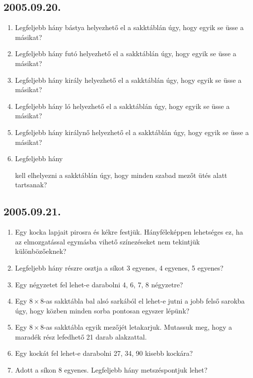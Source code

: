 \subsection*{2005.09.20.}
\begin{enumerate}
\item  Legfeljebb hány bástya helyezhető el a sakktáblán úgy, hogy egyik se üsse a másikat?
\item Legfeljebb hány futó helyezhető el a sakktáblán úgy, hogy egyik se üsse a másikat?
\item Legfeljebb hány király helyezhető el a sakktáblán úgy, hogy egyik se üsse a másikat?
\item Legfeljebb hány ló helyezhető el a sakktáblán úgy, hogy egyik se üsse a másikat?
\item Legfeljebb hány királynő helyezhető el a sakktáblán úgy, hogy egyik se üsse a másikat?
\item Legfeljebb hány
kell elhelyezni a sakktáblán úgy, hogy minden
szabad mezőt ütés alatt tartsanak?
\end{enumerate}


\subsection*{2005.09.21.}
\begin{enumerate}
\item Egy kocka lapjait pirosra és kékre festjük. Hányféleképpen lehetséges ez, ha az elmozgatással egymásba vihető színezéseket nem tekintjük különbözőeknek?

\item Legfeljebb hány részre osztja a síkot 3 egyenes, 4 egyenes, 5 egyenes?

\item Egy négyzetet fel lehet-e darabolni 4, 6, 7, 8 négyzetre?

\item Egy $8 \times 8$-as sakktábla bal alsó sarkából el lehet-e jutni a jobb felső sarokba úgy, hogy közben minden sorba pontosan egyszer lépünk?

\item Egy $8 \times 8$-as sakktábla egyik mezőjét letakarjuk. Mutassuk meg, hogy a maradék rész lefedhető 21 darab
alakzattal.

\item Egy kockát fel lehet-e darabolni 27, 34, 90 kisebb kockára?

\item Adott a síkon 8 egyenes. Legfeljebb hány metszéspontjuk lehet?

\end{enumerate}


